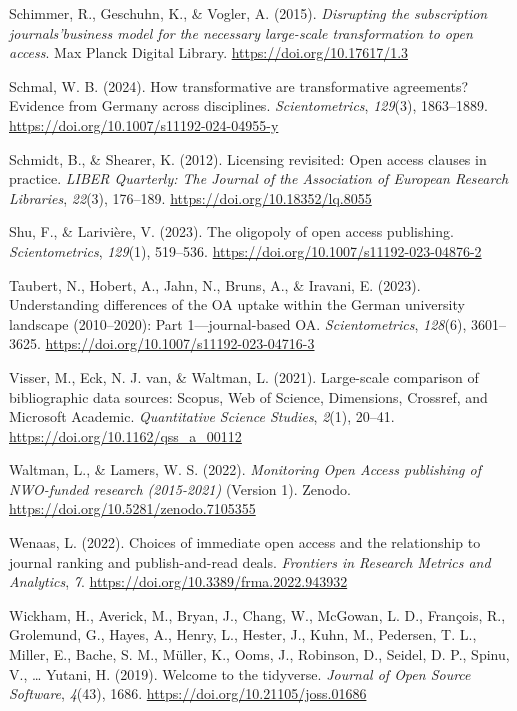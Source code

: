 \documentclass[a4paper,man,floatsintext,longtable,noextraspace,12pt]{apa6}
\newlength{\cslhangindent}
\newenvironment{CSLReferences}[2] %
  {\begin{list}{}{%
   \setlength{\itemindent}{0pt}
   \setlength{\leftmargin}{0pt}
   \setlength{\parsep}{0pt}
   \ifodd #1
    \setlength{\leftmargin}{\cslhangindent}
    \setlength{\itemindent}{-1\cslhangindent}
   \fi
   \setlength{\itemsep}{#2\baselineskip}}}
  {\end{list}}
\begin{document}
\begin{CSLReferences}{1}{0}
Schimmer, R., Geschuhn, K., \& Vogler, A. (2015). \emph{{Disrupting the
subscription journals'business model for the necessary large-scale
transformation to open access}}. Max Planck Digital Library.
\url{https://doi.org/10.17617/1.3}

Schmal, W. B. (2024). How transformative are transformative agreements?
Evidence from {Germany} across disciplines. \emph{Scientometrics},
\emph{129}(3), 1863--1889.
\url{https://doi.org/10.1007/s11192-024-04955-y}

Schmidt, B., \& Shearer, K. (2012). Licensing revisited: Open access
clauses in practice. \emph{LIBER Quarterly: The Journal of the
Association of European Research Libraries}, \emph{22}(3), 176--189.
\url{https://doi.org/10.18352/lq.8055}

Shu, F., \& Larivière, V. (2023). The oligopoly of open access
publishing. \emph{Scientometrics}, \emph{129}(1), 519--536.
\url{https://doi.org/10.1007/s11192-023-04876-2}

Taubert, N., Hobert, A., Jahn, N., Bruns, A., \& Iravani, E. (2023).
Understanding differences of the OA uptake within the {German}
university landscape (2010--2020): Part 1---journal-based OA.
\emph{Scientometrics}, \emph{128}(6), 3601--3625.
\url{https://doi.org/10.1007/s11192-023-04716-3}

Visser, M., Eck, N. J. van, \& Waltman, L. (2021). Large-scale
comparison of bibliographic data sources: {Scopus, Web of Science,
Dimensions, Crossref, and Microsoft Academic}. \emph{Quantitative
Science Studies}, \emph{2}(1), 20--41.
\url{https://doi.org/10.1162/qss_a_00112}

Waltman, L., \& Lamers, W. S. (2022). \emph{{Monitoring Open Access
publishing of NWO-funded research (2015-2021)}} (Version 1). Zenodo.
\url{https://doi.org/10.5281/zenodo.7105355}

Wenaas, L. (2022). Choices of immediate open access and the relationship
to journal ranking and publish-and-read deals. \emph{Frontiers in
Research Metrics and Analytics}, \emph{7}.
\url{https://doi.org/10.3389/frma.2022.943932}

Wickham, H., Averick, M., Bryan, J., Chang, W., McGowan, L. D.,
François, R., Grolemund, G., Hayes, A., Henry, L., Hester, J., Kuhn, M.,
Pedersen, T. L., Miller, E., Bache, S. M., Müller, K., Ooms, J.,
Robinson, D., Seidel, D. P., Spinu, V., \ldots{} Yutani, H. (2019).
Welcome to the {tidyverse}. \emph{Journal of Open Source Software},
\emph{4}(43), 1686. \url{https://doi.org/10.21105/joss.01686}


\end{CSLReferences}
\end{document}
